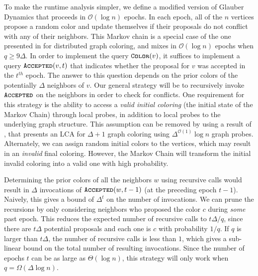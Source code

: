 To make the runtime analysis simpler, we define a modified version of Glauber Dynamics that proceeds in $\mathcal O(\log n)$ epochs.
In each epoch, all of the $n$ vertices propose a random color and update themselves if their proposals do not conflict with any of their neighbors.
This Markov chain is a special case of the one presented in \cite{ghaffari_fischer} for distributed graph coloring,
and mixes in $\mathcal O(\log n)$ epochs when $q\ge 9\Delta$.
In order to implement the query $\texttt{\textsc{Color}}(v)$, it suffices to implement a query $\texttt{\textsc{Accepted}}(v,t)$
that indicates whether the proposal for $v$ was accepted in the $t^{th}$ epoch.
The answer to this question depends on the prior colors of the potentially $\Delta$ neighbors of $v$.
Our general strategy will be to recursively invoke $\texttt{\textsc{Accepted}}$ on the neighbors in order to check for conflicts.
One requirement for this strategy is the ability to access a \emph{valid initial coloring} (the initial state of the Markov Chain)
through local probes, in addition to local probes to the underlying graph structure.
This assumption can be removed by using a result of \cite{coloring_initialize},
that presents an LCA for $\Delta+1$ graph coloring using $\Delta^{\mathcal O(1)}\log n$ graph probes.
Alternately, we can assign random initial colors to the vertices, which may result in an \emph{invalid} final coloring.
However, the Markov Chain will transform the initial invalid coloring into a valid one with high probability.

Determining the prior colors of all the neighbors $w$ using recursive calls would result in
$\Delta$ invocations of $\texttt{\textsc{Accepted}}(w, t-1)$ (at the preceding epoch $t-1$).
Naively, this gives a bound of $\Delta^t$ on the number of invocations.
We can prune the recursions by only considering neighbors who proposed the color $c$ during \emph{some} past epoch.
This reduces the expected number of recursive calls to $t\Delta/q$,
since there are $t\Delta$ potential proposals and each one is $c$ with probability $1/q$.
If $q$ is larger than $t\Delta$, the number of recursive calls is less than $1$,
which gives a sub-linear bound on the total number of resulting invocations.
Since the number of epochs $t$ can be as large as $\Theta(\log n)$, this strategy will only work when $q = \Omega(\Delta\log n)$.


